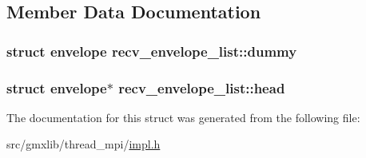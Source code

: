 \subsection{\-Member \-Data \-Documentation}
\hypertarget{structrecv__envelope__list_aaed023cf4534c425f765ef0a523bc11a}{
\subsubsection[{dummy}]{\setlength{\rightskip}{0pt plus 5cm}struct {\bf envelope} {\bf recv\-\_\-envelope\-\_\-list\-::dummy}}}\label{structrecv__envelope__list_aaed023cf4534c425f765ef0a523bc11a}
\hypertarget{structrecv__envelope__list_af67f0aa27a2161f06680e99a013da1ca}{
\subsubsection[{head}]{\setlength{\rightskip}{0pt plus 5cm}struct {\bf envelope}$\ast$ {\bf recv\-\_\-envelope\-\_\-list\-::head}}}\label{structrecv__envelope__list_af67f0aa27a2161f06680e99a013da1ca}


\-The documentation for this struct was generated from the following file\-:\begin{DoxyCompactItemize}
\item 
src/gmxlib/thread\-\_\-mpi/\hyperlink{impl_8h}{impl.\-h}\end{DoxyCompactItemize}
